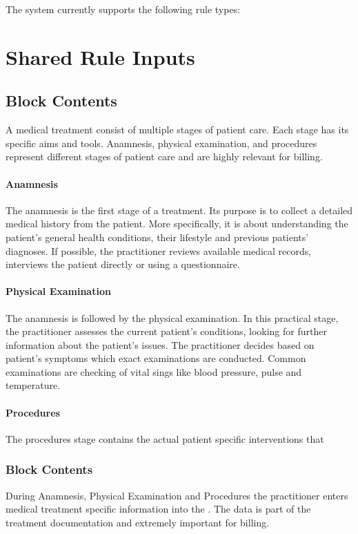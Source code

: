 The system currently supports the following rule types:
\section{Shared Rule Inputs}





\subsection{Block Contents}
A medical treatment consist of multiple stages of patient care.
Each stage has its specific aims and tools.
Anamnesis, physical examination,
and procedures represent different stages of patient care and are highly relevant for billing.

\paragraph{Anamnesis}
The anamnesis is the first stage of a treatment.
Its purpose is to collect a detailed medical history from the patient\cite{lino2021medical}.
More specifically, it is about understanding the patient's general health conditions,
their lifestyle and previous patients' diagnoses.
If possible, the practitioner reviews available medical records,
interviews the patient directly or using a questionnaire\cite{zhang2011anamnevis}.

\paragraph{Physical Examination}
The anamnesis is followed by the physical examination.
In this practical stage, the practitioner assesses the current patient's conditions,
looking for further information about the patient's issues\cite{seidel2010mosby}.
The practitioner decides based on patient's symptoms which exact examinations are conducted.
Common examinations are checking of vital sings like blood pressure, pulse and temperature.

\paragraph{Procedures}
The procedures stage contains the actual patient specific interventions that

\subsubsection{Block Contents}
During Anamnesis,
Physical Examination and Procedures the practitioner enters medical treatment specific information into the \AVS.
The data is part of the treatment documentation and extremely important for billing.

